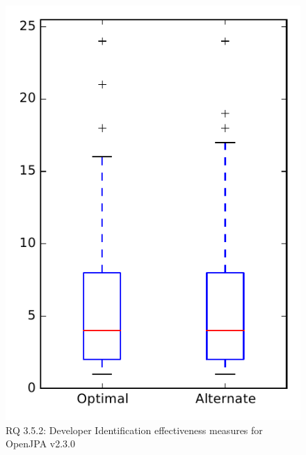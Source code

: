 
\begin{figure}
\centering
\includegraphics[height=0.4\textheight]{figures/combo/dit_rq2_openjpa}
\caption{RQ 3.5.2: Developer Identification effectiveness measures for OpenJPA v2.3.0}
\label{fig:dit:rq2:openjpa}
\end{figure}
